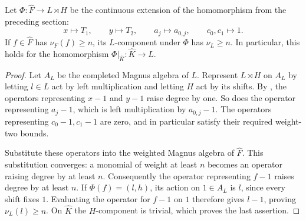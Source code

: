 \begin{lemma}\label{lem:transfer}
Let \(\Phi:\widehat F\to L\rtimes H\) be the continuous extension of
the homomorphism from the preceding section:
\[
 x\longmapsto T_1,\qquad y\longmapsto T_2,\qquad
 a_j\longmapsto a_{0,j},\qquad c_0,c_1\longmapsto1.
\]
If \(f\in\widehat F\) has \(\nu_F(f)\ge n\), its \(L\)-component
under \(\Phi\) has \(\nu_L\ge n\).  In particular, this holds for
the homomorphism \(\Phi|_{\widehat K}:\widehat K\to L\).
\end{lemma}

\begin{proof}
Let \(A_L\) be the completed Magnus algebra of \(L\).
Represent \(L\rtimes H\) on \(A_L\) by letting \(l\in L\) act by
left multiplication and letting \(H\) act by its shifts.
By , the operators representing \(x-1\) and
\(y-1\) raise degree by one.  So does the operator representing
\(a_j-1\), which is left multiplication by \(a_{0,j}-1\).
The operators representing \(c_0-1,c_1-1\) are zero, and in
particular satisfy their required weight-two bounds.

Substitute these operators into the weighted Magnus algebra of
\(\widehat F\).  This substitution converges: a monomial of weight
at least \(n\) becomes an operator raising degree by at least \(n\).
Consequently the operator representing \(f-1\) raises degree by
at least \(n\).  If \(\Phi(f)=(l,h)\), its action on \(1\in A_L\)
is \(l\), since every shift fixes \(1\).  Evaluating the operator
for \(f-1\) on \(1\) therefore gives \(l-1\), proving
\(\nu_L(l)\ge n\).  On \(\widehat K\) the \(H\)-component is
trivial, which proves the last assertion.
\end{proof}
